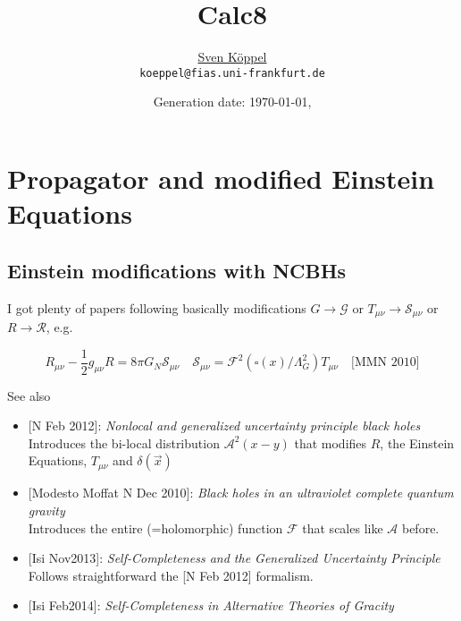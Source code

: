 \documentclass[10pt,a4paper, fleqn]{article}
\title{\vspace{-9ex} Calc8 \vspace{-1ex}} %
\author{\small %
\href{https://itp.uni-frankfurt.de/~koeppel}{Sven Köppel} \\
\small \texttt{koeppel@fias.uni-frankfurt.de}}
\date{\small Generation date: \today, \currenttime}
\begin{document}
\maketitle

\renewcommand{\d}{\mathrm{d}}
\newcommand{\dd}[2]{\frac{\mathrm{d} #1}{\mathrm{d} #2}}
\renewcommand{\L}{L_P}
\newcommand{\pr}{p_r}
\newcommand{\psenk}{p_\perp}
\newcommand{\ebenso}{\biggl( ~ \therefore ~ \biggr) }
\newcommand{\metrik}[1]{\d s^2 = \left( #1 \right) \d t^2 \left( #1 \right)^{-1} \d r^2 + r^2 \d \Omega_{D-2}^2 }
\newcommand{\winkel}{r^2 \d \Omega^2}
\newcommand{\dann}{$\rightarrow~$}
\newcommand{\T}{\mathcal{T}}
\newcommand{\A}{\mathcal{A}}

\section{Propagator and modified Einstein Equations}

\subsection{Einstein modifications with NCBHs}
I got plenty of papers following basically modifications $G\to\mathcal{G}$ or $T_{\mu\nu}\to\mathcal{S}_{\mu\nu}$ or $R\to\mathcal{R}$, e.g.

\begin{equation}
R_{\mu \nu} - \frac{1}{2} g_{\mu \nu} R = 8 \pi G_N {\mathcal S}_{\mu \nu}
\quad
{\mathcal S}_{\mu \nu} = {\mathcal F}^2(\square(x)/\Lambda_G^2) T_{\mu\nu}
\quad \text{[MMN 2010]}
\end{equation}

See also

\begin{itemize}
\item {} [N Feb 2012]: {\it Nonlocal and generalized uncertainty principle black holes} \\
Introduces the bi-local distribution $\mathcal{A}^2(x-y)$ that modifies $R$, the Einstein Equations, $T_{\mu\nu}$ and $\delta(\vec x)$
\item{} [Modesto Moffat N Dec 2010]: {\it Black holes in an ultraviolet complete quantum gravity} \\
Introduces the entire (=holomorphic) function $\mathcal{F}$ that scales like $\mathcal{A}$ before.
\item {} [Isi Nov2013]: {\it Self-Completeness and the Generalized Uncertainty Principle} \\
Follows straightforward the [N Feb 2012] formalism.
\item {} [Isi Feb2014]: {\it Self-Completeness in Alternative Theories of Gracity} \\

\end{itemize}
\end{document}
